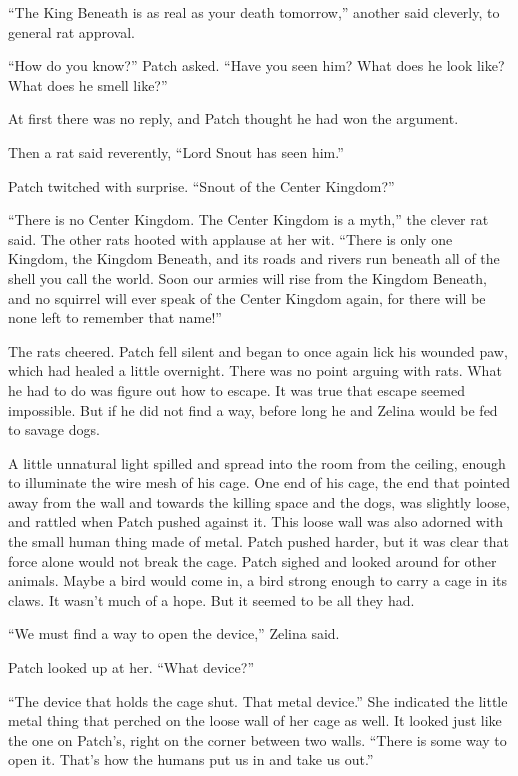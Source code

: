 \documentclass[ebook,oneside,openany,17pt]{memoir}
\begin{document}
“The King Beneath is as real as your death tomorrow,” another said
cleverly, to general rat approval.

“How do you know?” Patch asked. “Have you seen him? What does he look
like? What does he smell like?”

At first there was no reply, and Patch thought he had won the
argument.

Then a rat said reverently, “Lord Snout has seen him.”

Patch twitched with surprise. “Snout of the Center Kingdom?”

“There is no Center Kingdom. The Center Kingdom is a myth,” the clever
rat said. The other rats hooted with applause at her wit. “There is
only one Kingdom, the Kingdom Beneath, and its roads and rivers run
beneath all of the shell you call the world. Soon our armies will rise
from the Kingdom Beneath, and no squirrel will ever speak of the
Center Kingdom again, for there will be none left to remember that
name!”

The rats cheered. Patch fell silent and began to once again lick his
wounded paw, which had healed a little overnight. There was no point
arguing with rats. What he had to do was figure out how to escape. It
was true that escape seemed impossible. But if he did not find a way,
before long he and Zelina would be fed to savage dogs.

A little unnatural light spilled and spread into the room from the
ceiling, enough to illuminate the wire mesh of his cage. One end of
his cage, the end that pointed away from the wall and towards the
killing space and the dogs, was slightly loose, and rattled when Patch
pushed against it. This loose wall was also adorned with the small
human thing made of metal. Patch pushed harder, but it was clear that
force alone would not break the cage. Patch sighed and looked around
for other animals. Maybe a bird would come in, a bird strong enough to
carry a cage in its claws. It wasn’t much of a hope. But it seemed to
be all they had.

“We must find a way to open the device,” Zelina said.

Patch looked up at her. “What device?”

“The device that holds the cage shut. That metal device.” She
indicated the little metal thing that perched on the loose wall of her
cage as well. It looked just like the one on Patch’s, right on the
corner between two walls. “There is some way to open it. That’s how
the humans put us in and take us out.”
\end{document}
